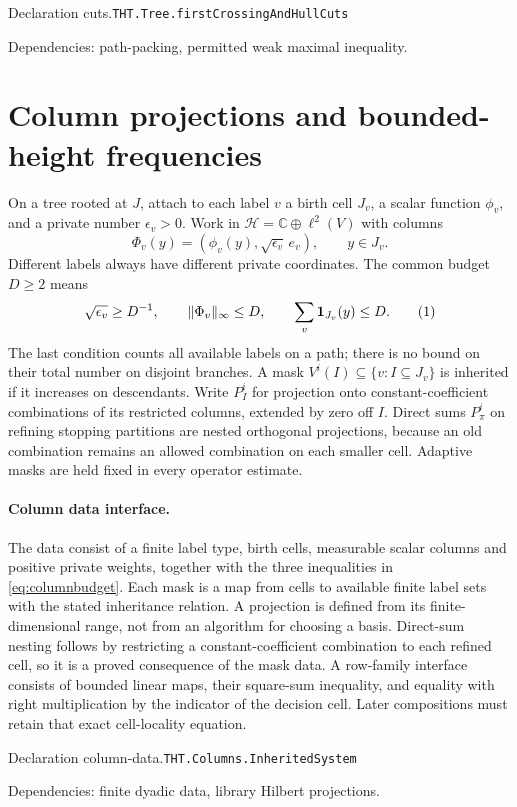 \documentclass[11pt]{article}
\theoremstyle{definition}
\newcommand{\C}{\mathbb C}
\newcommand{\one}{\mathbf 1}
\newcommand{\eqtag}[1]{\refstepcounter{equation}\tag{\theequation}\label{#1}}
\numberwithin{equation}{section}
\newcommand{\bp}[3]{\par\smallskip\begingroup\footnotesize
\noindent\hypertarget{bp:#1}{\textsf{Declaration #1.}}\quad\nolinkurl{#2}\par
\noindent\textsf{Dependencies:} #3.\par\endgroup\smallskip}
\begin{document}
\bp{cuts}{THT.Tree.firstCrossingAndHullCuts}{path-packing, permitted weak maximal inequality}


\section{Column projections and bounded-height frequencies}\label{sec:columns}
On a tree rooted at $J$, attach to each label $v$ a birth cell $J_v$, a scalar function $\phi_v$, and a private number $\epsilon_v>0$. Work in $\mathcal H=\C\oplus\ell^2(V)$ with columns
\[
 \Phi_v(y)=(\phi_v(y),\sqrt{\epsilon_v}\,e_v),\qquad y\in J_v.
\]
Different labels always have different private coordinates. The common budget $D\ge2$ means
\[
 \sqrt{\epsilon_v}\ge D^{-1},\qquad \|\Phi_v\|_\infty\le D,
 \qquad \sum_v\one_{J_v}(y)\le D.
 \eqtag{eq:columnbudget}
\]
The last condition counts all available labels on a path; there is no bound on their total number on disjoint branches. A mask $V^i(I)\subseteq\{v:I\subseteq J_v\}$ is inherited if it increases on descendants. Write $P_I^i$ for projection onto constant-coefficient combinations of its restricted columns, extended by zero off $I$. Direct sums $P_\pi^i$ on refining stopping partitions are nested orthogonal projections, because an old combination remains an allowed combination on each smaller cell. Adaptive masks are held fixed in every operator estimate.

\paragraph{Column data interface.}
The data consist of a finite label type, birth cells, measurable scalar columns and positive private weights, together with the three inequalities in \eqref{eq:columnbudget}. Each mask is a map from cells to available finite label sets with the stated inheritance relation. A projection is defined from its finite-dimensional range, not from an algorithm for choosing a basis. Direct-sum nesting follows by restricting a constant-coefficient combination to each refined cell, so it is a proved consequence of the mask data. A row-family interface consists of bounded linear maps, their square-sum inequality, and equality with right multiplication by the indicator of the decision cell. Later compositions must retain that exact cell-locality equation.
\bp{column-data}{THT.Columns.InheritedSystem}{finite dyadic data, library Hilbert projections}
\end{document}
